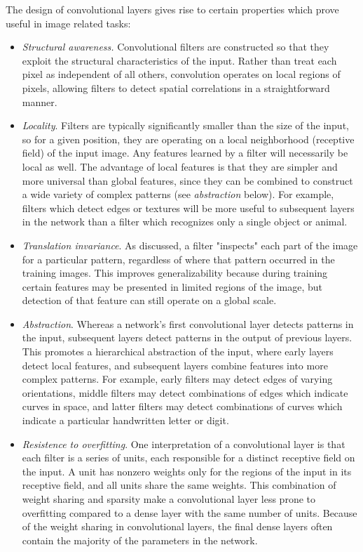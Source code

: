 The design of convolutional layers gives rise to certain properties which prove useful in image related tasks:
\begin{itemize}
	\item \textit{Structural awareness.}
	Convolutional filters are constructed so that they exploit the structural characteristics of the input.
 	Rather than treat each pixel as independent of all others, convolution operates on local regions of pixels, allowing filters to detect spatial correlations in a straightforward manner.
	\item \textit{Locality}. 
	Filters are typically significantly smaller than the size of the input, so for a given position, they are operating on a local neighborhood (receptive field) of the input image. 
	Any features learned by a filter will necessarily be local as well. 
 	The advantage of local features is that they are simpler and more universal than global features, since they can be combined to construct a wide variety of complex patterns (see \textit{abstraction} below).
	For example, filters which detect edges or textures will be more useful to subsequent layers in the network than a filter which recognizes only a single object or animal.
 	\item \textit{Translation invariance}. 
 	As discussed, a filter "inspects" each part of the image for a particular pattern, regardless of where that pattern occurred in the training images.
 	This improves generalizability because during training certain features may be presented in limited regions of the image, but detection of that feature can still operate on a global scale.
 	\item \textit{Abstraction}. Whereas a network's first convolutional layer detects patterns in the input, subsequent layers detect patterns in the output of previous layers. 
 	This promotes a hierarchical abstraction of the input, where early layers detect local features, and subsequent layers combine features into more complex patterns.
 	For example, early filters may detect edges of varying orientations, middle filters may detect combinations of edges which indicate curves in space, and latter filters may detect combinations of curves which indicate a particular handwritten letter or digit.
 	\item \textit{Resistence to overfitting}.
 	One interpretation of a convolutional layer is that each filter is a series of units, each responsible for a distinct receptive field on the input.
 	A unit has nonzero weights only for the regions of the input in its receptive field, and all units share the same weights. 
 	This combination of weight sharing and sparsity make a convolutional layer less prone to overfitting compared to a dense layer with the same number of units.
 	Because of the weight sharing in convolutional layers, the final dense layers often contain the majority of the parameters in the network.
\end{itemize}


